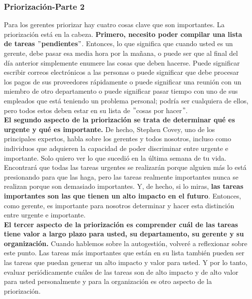 \documentclass[10pt]{book}
\begin{document}
\subsubsection{Priorización-Parte 2}
Para los gerentes priorizar hay cuatro cosas clave que son importantes. La priorización está en la cabeza. \textbf{Primero, necesito poder compilar una lista de tareas $"$pendientes$"$}. Entonces, lo que significa que cuando usted es un gerente, debe pasar esa media hora por la mañana, o puede ser que al final del día anterior simplemente enumere las cosas que deben hacerse. Puede significar escribir correos electrónicos a las personas o puede significar que debe procesar los pagos de sus proveedores rápidamente o puede significar una reunión con un miembro de otro departamento o puede significar pasar tiempo con uno de sus empleados que está teniendo un problema personal; podría ser cualquiera de ellos, pero todos estos deben estar en su lista de $"$cosas por hacer$"$.\\
\textbf{El segundo aspecto de la priorización se trata de determinar qué es urgente y qué es importante.} De hecho, Stephen Covey, uno de los principales expertos, habla sobre los gerentes y todos nosotros, incluso como individuos que adquieren la capacidad de poder discriminar entre urgente e importante. Solo quiero ver lo que sucedió en la última semana de tu vida. Encontrará que todas las tareas urgentes se realizarán porque alguien más lo está presionando para que las haga, pero las tareas realmente importantes nunca se realizan porque son demasiado importantes. Y, de hecho, si lo miras, \textbf{las tareas importantes son las que tienen un alto impacto en el futuro}. Entonces, como gerente, es importante para nosotros determinar y hacer esta distinción entre urgente e importante.\\
\textbf{El tercer aspecto de la priorización es comprender cuál de las tareas tiene valor a largo plazo para usted, su departamento, su gerente y su organización.} Cuando hablemos sobre la autogestión, volveré a reflexionar sobre este punto. Las tareas más importantes que están en su lista también pueden ser las tareas que puedan generar un alto impacto y valor para usted. Y por lo tanto, evaluar periódicamente cuáles de las tareas son de alto impacto y de alto valor para usted personalmente y para la organización es otro aspecto de la priorización.\\
\end{document}
